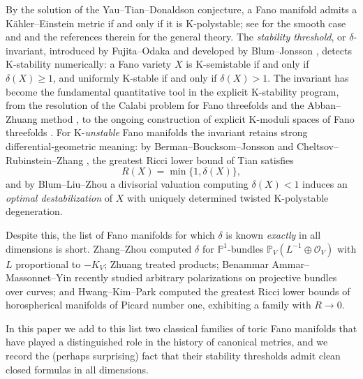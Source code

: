 \documentclass[11pt]{amsart}
\theoremstyle{definition}
\theoremstyle{remark}
\newcommand{\PP}{\mathbb{P}}
\begin{document}
By the solution of the Yau--Tian--Donaldson conjecture, a Fano manifold
admits a K\"ahler--Einstein metric if and only if it is K-polystable;
see \cite{CDS15,Tian15} for the smooth case and \cite{BBJ21,LXZ22} and
the references therein for the general theory. The
\emph{stability threshold}, or $\delta$-invariant, introduced by
Fujita--Odaka \cite{FO18} and developed by Blum--Jonsson \cite{BJ20},
detects K-stability numerically: a Fano variety $X$ is K-semistable if
and only if $\delta(X)\ge 1$, and uniformly K-stable if and only if
$\delta(X)>1$. The invariant has become the fundamental quantitative
tool in the explicit K-stability program, from the resolution of the
Calabi problem for Fano threefolds \cite{ACC23} and the
Abban--Zhuang method \cite{AZ22}, to the ongoing construction of
explicit K-moduli spaces of Fano threefolds
\cite{ADEKJMP25,EJP25,KLPZ26}. For K-\emph{unstable} Fano manifolds the
invariant retains strong differential-geometric meaning: by
Berman--Boucksom--Jonsson and Cheltsov--Rubinstein--Zhang
\cite{BBJ21,CRZ19}, the greatest Ricci lower bound of Tian
\cite{Tian92,Szekelyhidi11} satisfies
\begin{equation}\label{eq:RX}
R(X)=\min\{1,\delta(X)\},
\end{equation}
and by Blum--Liu--Zhou \cite{BLZ22} a divisorial valuation computing
$\delta(X)<1$ induces an \emph{optimal destabilization} of $X$ with
uniquely determined twisted K-polystable degeneration.

Despite this, the list of Fano manifolds for which $\delta$ is known
\emph{exactly} in all dimensions is short. Zhang--Zhou \cite{ZZ21}
computed $\delta$ for $\PP^1$-bundles $\PP_V(L^{-1}\oplus\mathcal O_V)$
with $L$ proportional to $-K_V$; Zhuang \cite{Zhuang20} treated
products; Benammar Ammar--Massonnet--Yin \cite{BMY24} recently studied
arbitrary polarizations on projective bundles over curves; and
Hwang--Kim--Park \cite{HKP23} computed the greatest Ricci lower bounds
of horospherical manifolds of Picard number one, exhibiting a family
with $R\to 0$.

In this paper we add to this list two classical families of toric Fano
manifolds that have played a distinguished role in the history of
canonical metrics, and we record the (perhaps surprising) fact that
their stability thresholds admit clean closed formulas in all
dimensions.
\end{document}
